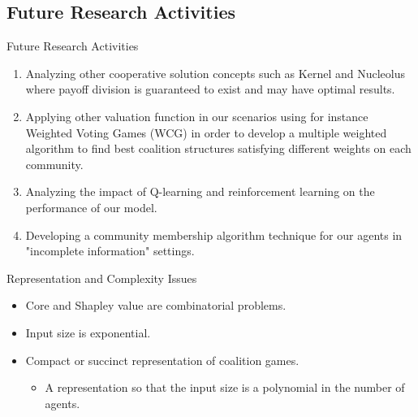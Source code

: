 \documentclass{beamer}
\begin{document}
\subsection{Future Research Activities}
\begin{frame}{Future Research Activities}
    \begin{enumerate}
        \item Analyzing other cooperative solution concepts such as Kernel
        and Nucleolus where payoff division is guaranteed to exist and may
        have optimal results.

        \item Applying other valuation function in our scenarios using for
        instance Weighted Voting Games (WCG) in order to develop a
        multiple weighted algorithm to find best coalition structures
        satisfying different weights on each community.

        \item Analyzing the impact of Q-learning and reinforcement
        learning on the performance of our model.

        \item Developing a community membership algorithm technique for
        our agents in "incomplete information" settings.

    \end{enumerate}
\end{frame}

\begin{frame}{Representation and Complexity Issues}
    \begin{itemize}
        \item Core and Shapley value are combinatorial problems.
        \item Input size is exponential.
        \item Compact or succinct representation of coalition games.
        \begin{itemize}
            \item A representation so that the input size is a polynomial in the number of agents.
        \end{itemize}
    \end{itemize}
\end{frame}
\end{document}
